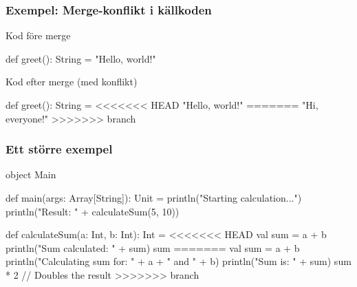 \begin{frame}[fragile]
    \frametitle{Exempel: Merge-konflikt i källkoden}

    \begin{block}{\small Kod före merge}
        \begin{GobbleCode}[0pt]{10}
            def greet(): String = {
                "Hello, world!"
            }
        \end{GobbleCode}
    \end{block}

    \begin{block}{\small Kod efter merge (med konflikt)}
        \begin{GobbleCode}[0pt]{10}
            def greet(): String = {
            <<<<<<< HEAD
                "Hello, world!"
            =======
                "Hi, everyone!"
            >>>>>>> branch
            }
        \end{GobbleCode}
    \end{block}

    \begin{itemize}
    \end{itemize}
    
\end{frame}


\begin{frame}[fragile]
    \frametitle{Ett större exempel}

    \begin{GobbleCode}[2pt]{6}
        object Main {
            def main(args: Array[String]): Unit = {
                println("Starting calculation...")
                println("Result: " + calculateSum(5, 10))
            }

            def calculateSum(a: Int, b: Int): Int = {
        <<<<<<< HEAD
                val sum = a + b
                println("Sum calculated: " + sum)
                sum
        =======
                val sum = a + b
                println("Calculating sum for: " + a + " and " + b)
                println("Sum is: " + sum)
                sum * 2 // Doubles the result
        >>>>>>> branch
            }
        }
    \end{GobbleCode}
    
\end{frame}

